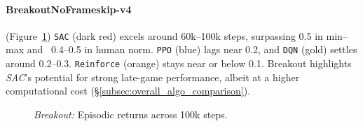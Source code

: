 \paragraph{BreakoutNoFrameskip-v4}
(Figure~\ref{fig:breakout_comparison_combined})
\texttt{SAC} (dark red) excels around 60k--100k steps, surpassing 0.5 in min--max 
and ~0.4--0.5 in human norm. \texttt{PPO} (blue) lags near 0.2, and \texttt{DQN} (gold) 
settles around 0.2--0.3. 
\texttt{Reinforce} (orange) stays near or below 0.1. 
Breakout highlights \emph{SAC}’s potential for strong late-game performance, 
albeit at a higher computational cost (\S\ref{subsec:overall_algo_comparison}).
\begin{figure} 
	\centering
	\quad
	\caption{\emph{Breakout:} Episodic returns across 100k steps.}
	\label{fig:breakout_comparison_combined}
\end{figure}


